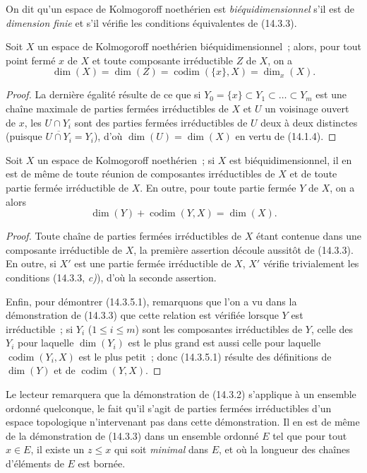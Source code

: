 On dit qu'un espace de Kolmogoroff noethérien est \emph{biéquidimensionnel}
s'il est de \emph{dimension finie} et s'il vérifie les conditions équivalentes
de (14.3.3).

\begin{corollary}[14.3.4]
\label{0.14.3.4-fr}
Soit $X$ un espace de Kolmogoroff noethérien biéquidimensionnel~; alors, pour
tout point fermé $x$ de $X$ et toute composante irréductible $Z$ de $X$, on a
\[
  \dim(X)=\dim(Z)=\operatorname{codim}(\{x\},X)=\dim_x(X).
  \tag{14.3.4.1}\label{0.14.3.4.1-fr}
\]
\end{corollary}

\begin{proof}
La dernière égalité résulte de ce que si
$Y_0=\{x\}\subset Y_1\subset\ldots\subset Y_m$ est une chaîne maximale de
parties fermées irréductibles de $X$ et $U$ un voisinage ouvert de $x$, les
$U\cap Y_i$ sont des parties fermées irréductibles de $U$ deux à deux
distinctes (puisque $\overline{U\cap Y_i}=Y_i$), d'où
$\dim(U)=\dim(X)$ en vertu de (14.1.4).
\end{proof}

\begin{corollary}[14.3.5]
\label{0.14.3.5-fr}
Soit $X$ un espace de Kolmogoroff noethérien~; si $X$ est
biéquidimensionnel, il en est de même de toute réunion de composantes
irréductibles de $X$ et de toute partie fermée irréductible de $X$. En outre,
pour toute partie fermée $Y$ de $X$, on a alors
\[
  \dim(Y)+\operatorname{codim}(Y,X)=\dim(X).
  \tag{14.3.5.1}\label{0.14.3.5.1-fr}
\]
\end{corollary}

\begin{proof}
Toute chaîne de parties fermées irréductibles de $X$ étant contenue dans une
composante irréductible de $X$, la première assertion découle aussitôt de
(14.3.3). En outre, si $X'$ est une partie fermée irréductible de $X$, $X'$
vérifie trivialement les conditions (14.3.3, \emph{c)}), d'où la seconde assertion.

Enfin, pour démontrer (14.3.5.1), remarquons que l'on a vu dans la
démonstration de (14.3.3) que cette relation est vérifiée lorsque $Y$ est
irréductible~; si $Y_i$ ($1\leq i\leq m$) sont les composantes irréductibles
de $Y$, celle des $Y_i$ pour laquelle $\dim(Y_i)$ est le plus grand est aussi
celle pour laquelle $\operatorname{codim}(Y_i,X)$ est le plus petit~; donc
(14.3.5.1) résulte des définitions de $\dim(Y)$ et de
$\operatorname{codim}(Y,X)$.
\end{proof}

\begin{remark}[14.3.6]
\label{0.14.3.6-fr}
Le lecteur remarquera que la démonstration de (14.3.2) s'applique à un
ensemble ordonné quelconque, le fait qu'il s'agit de parties fermées
irréductibles d'un espace topologique n'intervenant pas dans cette
démonstration. Il en est de même de la démonstration de (14.3.3) dans un
ensemble ordonné $E$ tel que pour tout $x\in E$, il existe un $z\leq x$ qui
soit \emph{minimal} dans $E$, et où la longueur des chaînes d'éléments de $E$
est bornée.
\end{remark}

